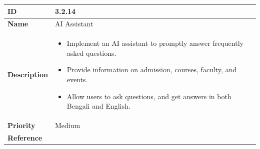 \documentclass[11pt]{article}
\begin{document}
\vspace{0.5cm}

\begin{center}
\begin{tabular}{ | >{\bfseries}m{5em} | m{10cm} |  } 
  \hline
  ID & 3.2.14\\  
  \hline
  Name & AI Assistant \\  
  \hline
  Description & 
  \begin{itemize}
      \item Implement an AI assistant to promptly answer frequently asked questions.
      \item Provide information on admission, courses, faculty, and events.
      \item Allow users to ask questions, and get answers in both Bengali and English.
  \end{itemize} \\ 
  \hline
  Priority & Medium\\
  \hline 
  Reference & \\
  \hline
  
\end{tabular}
\end{center}
\end{document}
